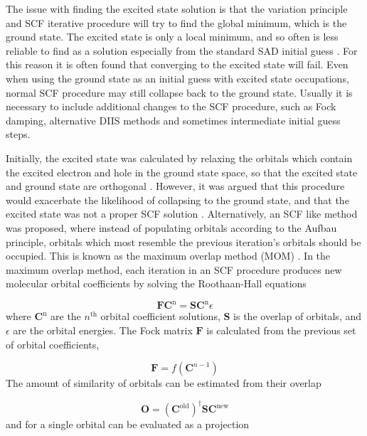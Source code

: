 The issue with finding the excited state solution is that the variation principle
and SCF iterative procedure will try to find the global minimum, which is the 
ground state. The excited state is only a local minimum, and so often is less reliable
to find as a solution especially from the standard SAD initial guess \cite{Almlof1982}. 
For this reason it is often found that converging to the \dscf excited state will
fail. Even when using the ground state as an initial guess with excited state occupations,
normal SCF procedure may still collapse back to the ground state. Usually it is 
necessary to include additional changes to the SCF procedure, such as Fock damping, 
alternative DIIS methods and sometimes intermediate initial guess steps.

Initially, the excited state was calculated by relaxing the orbitals which
contain the excited electron and hole in the ground state space, so that the
excited state and ground state are orthogonal \cite{Hunt1969}. However, it was
argued that this procedure would exacerbate the likelihood of collapsing to the ground
state, and that the excited state was not a proper SCF solution \cite{Gilbert2008}.
Alternatively, an SCF like method was proposed, where instead of populating orbitals 
according to the Aufbau principle, orbitals which most resemble the previous iteration's
orbitals should be occupied. This is known as the maximum overlap method (MOM) \cite{Gilbert2008}. 
In the maximum overlap method, each iteration in an SCF procedure produces new molecular
orbital coefficients by solving the Roothaan-Hall equations \cite{Roothaan1951}

\begin{equation}
\mathbf{F} \mathbf{C}^{\text{n}} = \mathbf{S} \mathbf{C}^{\text{n}} \epsilon
\label{eq:roothaan_hall}
\end{equation}
%
where $\mathbf{C}^{\text{n}}$ are the $n^{\text{th}}$ orbital coefficient solutions, 
$\mathbf{S}$ is the overlap of orbitals, and $\epsilon$ are the orbital energies. 
The Fock matrix $\mathbf{F}$ is calculated from the previous set of orbital 
coefficients,

\begin{equation}
\mathbf{F} = f\left(\mathbf{C}^{n-1}\right)
\end{equation}
%
The amount of similarity of orbitals can be estimated from their overlap

\begin{equation}
\mathbf{O} = \left(\mathbf{C}^{\text{old}}\right)^\dagger \mathbf{S} \mathbf{C}^{\text{new}}
\end{equation}
%
and for a single orbital can be evaluated as a projection

